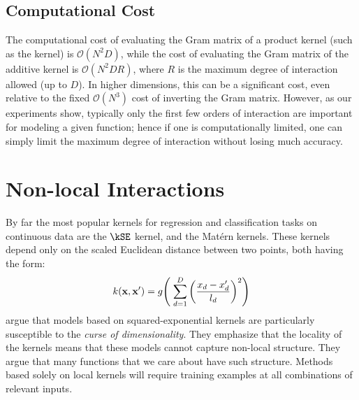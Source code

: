 

\subsection{Computational Cost}
The computational cost of evaluating the Gram matrix of a product kernel (such as the \kSE{} kernel) is $\mathcal{O}(N^2D)$, while the cost of evaluating the Gram matrix of the additive kernel is $\mathcal{O}(N^2DR)$, where $R$ is the maximum degree of interaction allowed (up to $D$).
In higher dimensions, this can be a significant cost, even relative to the fixed $\mathcal{O}(N^3)$ cost of inverting the Gram matrix.
However, as our experiments show, typically only the first few orders of interaction are important for modeling a given function; hence if one is computationally limited, one can simply limit the maximum degree of interaction without losing much accuracy.



\section{Non-local Interactions}
%
By far the most popular kernels for regression and classification tasks on continuous data are the $\kSE$ kernel, and the Mat\'{e}rn kernels.
These kernels depend only on the scaled Euclidean distance between two points, both having the form:
\begin{align}
k({\bf x, x'}) = g \!\left( \; \sum_{d=1}^D \left( \frac{  x_{d} - x_{d}' }{ l_d } \right)^2 \right)
\end{align}
\citet{bengio2006curse} argue that models based on squared-exponential kernels are particularly susceptible to the \textit{curse of dimensionality}.
They emphasize that the locality of the kernels means that these models cannot capture non-local structure. 
They argue that many functions that we care about have such structure.
Methods based solely on local kernels will require training examples at all combinations of relevant inputs.

